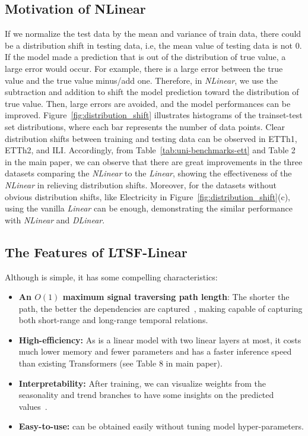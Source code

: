 \subsection{Motivation of NLinear}
% 
If we normalize the test data by the mean and variance of train data, there could be a distribution shift in testing data, i.e, the mean value of testing data is not 0. If the model made a prediction that is out of the distribution of true value, a large error would occur. For example, there is a large error between the true value and the true value minus/add one. Therefore, in \emph{NLinear}, we use the subtraction and addition to shift the model prediction toward the distribution of true value. Then, large errors are avoided, and the model performances can be improved.
%
Figure~\ref{fig:distribution_shift} illustrates histograms of the trainset-test set distributions, where each bar represents the number of data points. Clear distribution shifts between training and testing data can be observed in ETTh1, ETTh2, and ILI. Accordingly, from Table~\ref{tab:uni-benchmarks-ett} and Table 2 in the main paper, we can observe that there are great improvements in the three datasets comparing the \emph{NLinear} to the \emph{Linear}, showing the effectiveness of the \emph{NLinear} in relieving distribution shifts. Moreover, for the datasets without obvious distribution shifts, like Electricity in Figure~\ref{fig:distribution_shift}(c), using the vanilla \emph{Linear} can be enough, demonstrating the similar performance with \emph{NLinear} and \emph{DLinear}.






\subsection{The Features of LTSF-Linear}


Although \modelname is simple, it has some compelling characteristics:

\begin{itemize}
\item \textbf{An $O(1)$ maximum signal traversing path length}: The shorter the path, the better the dependencies are captured~\cite{liu2021pyraformer}, making \modelname capable of capturing both short-range and long-range temporal relations.


\item \textbf{High-efficiency:} As \modelname is a linear model with two linear layers at most, it costs much lower memory and fewer parameters and has a faster inference speed than existing Transformers (see Table $8$ in main paper). 



\item \textbf{Interpretability:} After training, we can visualize weights from the seasonality and trend branches to have some insights on the predicted values~\cite{dong2008granular}. 


\item \textbf{Easy-to-use:} \modelname can be obtained easily without tuning model hyper-parameters.


\end{itemize}

